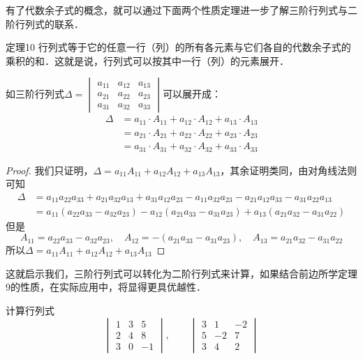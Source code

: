 有了代数余子式的概念，就可以通过下面两个性质定理进一步了解三阶行列式与二阶行列式的联系．

\begin{blk}{定理10}
    行列式等于它的任意一行（列）的所有各元素与它们各自的代数余子式的乘积的和．这就是说，行列式可以按其中一行（列）的元素展开．
    
    如三阶行列式$\Delta=\begin{vmatrix}
        a_{11}&a_{12}&a_{13}\\
        a_{21}&a_{22}&a_{23}\\
        a_{31}&a_{32}&a_{33}
    \end{vmatrix}$可以展开成：
\[\begin{split}
    \Delta &= a_{11}\cdot A_{11}+a_{12}\cdot A_{12}+a_{13}\cdot A_{13}\\
    &= a_{21}\cdot A_{21}+a_{22}\cdot A_{22}+a_{23}\cdot A_{23}\\
    &= a_{31}\cdot A_{31}
    +a_{32}\cdot A_{32}+a_{33}\cdot A_{33}
\end{split}\]
\end{blk}

\begin{proof}
我们只证明，$\Delta =a_{11}A_{11}+a_{12} A_{12}+a_{13} A_{13}$，其余证明类同，由对角线法则可知
\[\begin{split}
\Delta &=a_{11}a_{22}a_{33}+a_{21}a_{32}a_{13}+a_{31}a_{12}a_{23}-a_{11}a_{32}a_{23}-a_{21}a_{12}a_{33}-a_{31}a_{22}a_{13}\\
&=a_{11}(a_{22}a_{33}-a_{32}a_{23})-a_{12}(a_{21}a_{33}-a_{31}a_{23})+a_{13}(a_{21}a_{32}-a_{31}a_{22})
\end{split}\]
但是
\[A_{11}=a_{22}a_{33}-a_{32}a_{23},\quad A_{12}=-(a_{21}a_{33}-a_{31}a_{23}),\quad A_{13}=a_{21}a_{32}-a_{31}a_{22}\]
所以$\Delta =a_{11}A_{11}+a_{12} A_{12}+a_{13} A_{13}$
\end{proof}

这就启示我们，三阶行列式可以转化为二阶行列式来计算，如果结合前边所学定理9的性质，在实际应用中，将显得更具优越性．

\begin{example}
    计算行列式
\[\begin{vmatrix}
    1&3&5\\2&4&8\\3&0&-1
\end{vmatrix},\qquad \begin{vmatrix}
    3&1&-2\\5&-2&7\\3&4&2
\end{vmatrix}\]
\end{example}



